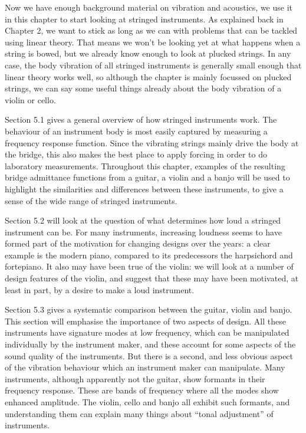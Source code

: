  Now we have enough background material on vibration and acoustics, we use it 
  in this chapter to start looking at stringed instruments. As explained back 
  in Chapter 2, we want to stick as long as we can with problems that can be 
  tackled using linear theory. That means we won't be looking yet at what 
  happens when a string is bowed, but we already know enough to look at plucked 
  strings. In any case, the body vibration of all stringed instruments is 
  generally small enough that linear theory works well, so although the chapter 
  is mainly focussed on plucked strings, we can say some useful things already 
  about the body vibration of a violin or cello. 

  Section 5.1 gives a general overview of how stringed instruments work. The 
  behaviour of an instrument body is most easily captured by measuring a 
  frequency response function. Since the vibrating strings mainly drive the 
  body at the bridge, this also makes the best place to apply forcing in order 
  to do laboratory measurements. Throughout this chapter, examples of the 
  resulting bridge admittance functions from a guitar, a violin and a banjo 
  will be used to highlight the similarities and differences between these 
  instruments, to give a sense of the wide range of stringed instruments. 

  Section 5.2 will look at the question of what determines how loud a stringed 
  instrument can be. For many instruments, increasing loudness seems to have 
  formed part of the motivation for changing designs over the years: a clear 
  example is the modern piano, compared to its predecessors the harpsichord and 
  fortepiano. It also may have been true of the violin: we will look at a 
  number of design features of the violin, and suggest that these may have been 
  motivated, at least in part, by a desire to make a loud instrument. 

  Section 5.3 gives a systematic comparison between the guitar, violin and 
  banjo. This section will emphasise the importance of two aspects of design. 
  All these instruments have signature modes at low frequency, which can be 
  manipulated individually by the instrument maker, and these account for some 
  aspects of the sound quality of the instruments. But there is a second, and 
  less obvious aspect of the vibration behaviour which an instrument maker can 
  manipulate. Many instruments, although apparently not the guitar, show 
  formants in their frequency response. These are bands of frequency where all 
  the modes show enhanced amplitude. The violin, cello and banjo all exhibit 
  such formants, and understanding them can explain many things about ``tonal 
  adjustment'' of instruments. 


